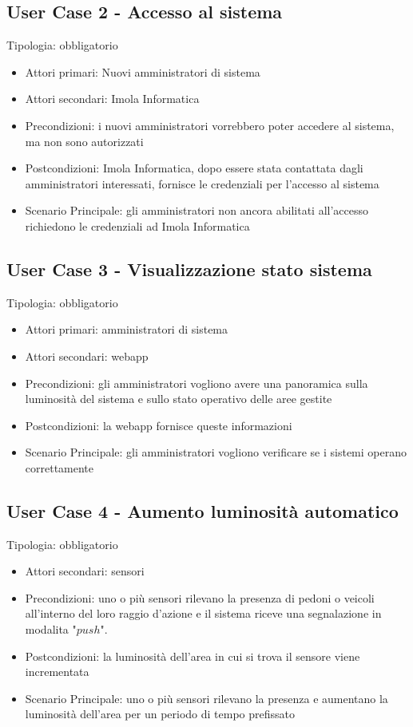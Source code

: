 \documentclass[12pt]{article}
\begin{document}
\subsection{User Case 2 - Accesso al sistema}
Tipologia: obbligatorio
\begin{itemize}
	\item Attori primari: Nuovi amministratori di sistema
	\item Attori secondari: Imola Informatica
	\item Precondizioni: i nuovi amministratori vorrebbero poter accedere al sistema, ma non sono autorizzati
	\item Postcondizioni: Imola Informatica, dopo essere stata contattata dagli amministratori interessati, fornisce le credenziali per l'accesso al sistema
	\item Scenario Principale: gli amministratori non ancora abilitati all'accesso richiedono le credenziali ad Imola Informatica
\end{itemize}

\subsection{User Case 3 - Visualizzazione stato sistema}
Tipologia: obbligatorio
\begin{itemize}
	\item Attori primari: amministratori di sistema
	\item Attori secondari: webapp
	\item Precondizioni: gli amministratori vogliono avere una panoramica sulla luminosità del sistema e sullo stato operativo delle aree gestite
	\item Postcondizioni: la webapp fornisce queste informazioni
	\item Scenario Principale: gli amministratori vogliono verificare se i sistemi operano correttamente
\end{itemize}

\subsection{User Case 4 - Aumento luminosità automatico}
Tipologia: obbligatorio
\begin{itemize}
	\item Attori secondari: sensori
	\item Precondizioni: uno o più sensori rilevano la presenza di pedoni o veicoli all'interno del loro raggio d'azione e il sistema riceve una segnalazione in modalita "$push$".
	\item Postcondizioni: la luminosità dell'area in cui si trova il sensore viene incrementata
	\item Scenario Principale: uno o più sensori rilevano la presenza e aumentano la luminosità dell'area per un periodo di tempo prefissato
\end{itemize}
\end{document}

